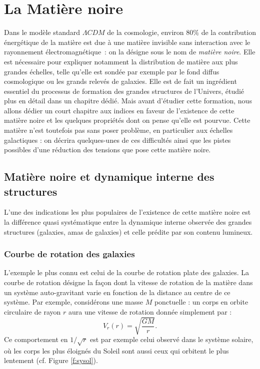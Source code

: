 \chapter{La Matière noire}

Dans le modèle standard $\Lambda CDM$ de la cosmologie, environ $80\%$ de la contribution énergétique de la matière est due à une matière invisible sans interaction avec le rayonnement électromagnétique~: on la désigne sous le nom de \textit{matière noire}. Elle est nécessaire pour expliquer notamment la distribution de matière aux plus grandes échelles, telle qu'elle est sondée par exemple par le fond diffus cosmologique ou les grands relevés de galaxies. Elle est de fait un ingrédient essentiel du processus de formation des grandes structures de l'Univers, étudié plus en détail dans un chapitre dédié. Mais avant d'étudier cette formation, nous allons dédier un court chapitre aux indices en faveur de l'existence de cette matière noire et les quelques propriétés dont on pense qu'elle est pourvue. Cette matière n'est toutefois pas sans poser problème, en particulier aux échelles galactiques : on décrira quelques-unes de ces difficultés ainsi que les pistes possibles d'une réduction des tensions que pose cette matière noire.

\section{Matière noire et dynamique interne des structures}
L'une des indications les plus populaires de l'existence de cette matière noire est la différence quasi systématique entre la dynamique interne observée des grandes structures (galaxies, amas de galaxies) et celle prédite par son contenu lumineux.

\subsection{Courbe de rotation des galaxies}
L'exemple le plus connu est celui de la courbe de rotation plate des galaxies. La courbe de rotation désigne  la façon dont la vitesse de rotation de la matière dans un système auto-gravitant varie en fonction de la distance au centre de ce système. Par exemple, considérons une masse $M$ ponctuelle : un corps en orbite circulaire de rayon $r$ aura une vitesse de rotation donnée simplement par :
\begin{equation}
V_r(r)=\sqrt{\frac{GM}{r}}.
\end{equation} 
Ce comportement en $1/\sqrt{r}$ est par exemple celui observé dans le système solaire, où les corps les plus éloignés du Soleil sont aussi ceux qui orbitent le plus lentement (cf. Figure \ref{f:sysol}). 

